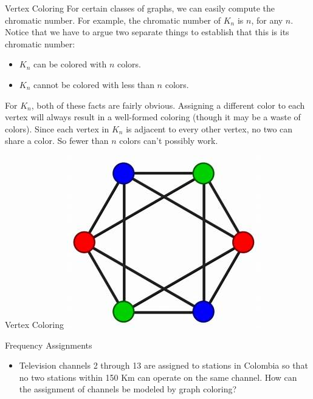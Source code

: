 \documentclass{beamer}
\theoremstyle{definition}
\begin{document}
\begin{frame}{Vertex Coloring}
    For certain classes of graphs, we can easily compute the chromatic number. For example, the chromatic number of $K_n$ is $n$, for any $n$. Notice that we have to argue two separate things to establish that this is its chromatic number:
    \begin{itemize}
        \item $K_n$ can be colored with $n$ colors.
        \item $K_n$ cannot be colored with less than $n$ colors.
    \end{itemize}
    For $K_n$, both of these facts are fairly obvious. Assigning a different color to each vertex will always result in a well-formed coloring (though it may be a waste of colors). Since each vertex in $K_n$ is adjacent to every other vertex, no two can share a color. So fewer than $n$ colors can't possibly work.
\end{frame}

\begin{frame}{Vertex Coloring}
    \centering \includegraphics[width=.6\linewidth]{p4.jpg}
\end{frame}

\begin{frame}{Frequency Assignments}
    \begin{itemize}
     \item Television channels 2 through 13 are assigned to stations in Colombia so that no two stations within 150 Km can operate on the same channel. How can the assignment of channels be modeled by graph coloring?
    \end{itemize}
\end{frame}
\end{document}
